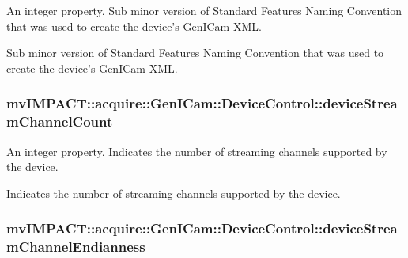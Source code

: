 An integer property. Sub minor version of Standard Features Naming Convention that was used to create the device's \hyperlink{namespacemv_i_m_p_a_c_t_1_1acquire_1_1_gen_i_cam}{Gen\+I\+Cam} X\+M\+L. 

Sub minor version of Standard Features Naming Convention that was used to create the device's \hyperlink{namespacemv_i_m_p_a_c_t_1_1acquire_1_1_gen_i_cam}{Gen\+I\+Cam} X\+M\+L. \hypertarget{classmv_i_m_p_a_c_t_1_1acquire_1_1_gen_i_cam_1_1_device_control_a4fafc834ade170cbf44bdf052a803bac}{
\subsubsection[{device\+Stream\+Channel\+Count}]{ mv\+I\+M\+P\+A\+C\+T\+::acquire\+::\+Gen\+I\+Cam\+::\+Device\+Control\+::device\+Stream\+Channel\+Count}}\label{classmv_i_m_p_a_c_t_1_1acquire_1_1_gen_i_cam_1_1_device_control_a4fafc834ade170cbf44bdf052a803bac}


An integer property. Indicates the number of streaming channels supported by the device. 

Indicates the number of streaming channels supported by the device. \hypertarget{classmv_i_m_p_a_c_t_1_1acquire_1_1_gen_i_cam_1_1_device_control_a33540ea3ea9d775da3b88d3cde9d12f3}{
\subsubsection[{device\+Stream\+Channel\+Endianness}]{ mv\+I\+M\+P\+A\+C\+T\+::acquire\+::\+Gen\+I\+Cam\+::\+Device\+Control\+::device\+Stream\+Channel\+Endianness}}\label{classmv_i_m_p_a_c_t_1_1acquire_1_1_gen_i_cam_1_1_device_control_a33540ea3ea9d775da3b88d3cde9d12f3}



